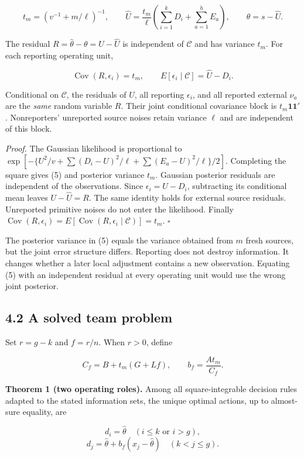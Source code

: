 \documentclass[
  11pt,
]{article}
\begin{document}
\[t_m=\left(v^{-1}+m/\ell\right)^{-1},\qquad
\widehat U=\frac{t_m}{\ell}\left(\sum_{i=1}^kD_i+\sum_{a=1}^hE_a\right),
\qquad \widehat\theta=s-\widehat U. \tag{5}\]

The residual \(R=\widehat\theta-\theta=U-\widehat U\) is independent of
\(\mathcal C\) and has variance \(t_m\). For each reporting operating
unit,

\[\operatorname{Cov}(R,\epsilon_i)=t_m,\qquad
E[\epsilon_i\mid\mathcal C]=\widehat U-D_i. \tag{6}\]

Conditional on \(\mathcal C\), the residuals of \(U\), all reporting
\(\epsilon_i\), and all reported external \(\nu_a\) are the \emph{same}
random variable \(R\). Their joint conditional covariance block is
\(t_m\mathbf1\mathbf1'\). Nonreporters' unreported source noises retain
variance \(\ell\) and are independent of this block.

\emph{Proof.} The Gaussian likelihood is proportional to
\(\exp[-\{U^2/v+\sum(D_i-U)^2/\ell+\sum(E_a-U)^2/\ell\}/2]\). Completing
the square gives (5) and posterior variance \(t_m\). Gaussian posterior
residuals are independent of the observations. Since
\(\epsilon_i=U-D_i\), subtracting its conditional mean leaves
\(U-\widehat U=R\). The same identity holds for external source
residuals. Unreported primitive noises do not enter the likelihood.
Finally
\(\operatorname{Cov}(R,\epsilon_i)=E[\operatorname{Cov}(R,\epsilon_i\mid\mathcal C)]=t_m\).
\(\square\)

The posterior variance in (5) equals the variance obtained from \(m\)
fresh sources, but the joint error structure differs. Reporting does not
destroy information. It changes whether a later local adjustment
contains a new observation. Equating (5) with an independent residual at
every operating unit would use the wrong joint posterior.

\subsection{4.2 A solved team problem}\label{a-solved-team-problem}

Set \(r=g-k\) and \(f=r/n\). When \(r>0\), define

\[C_f=B+t_m(G+Lf),\qquad b_f=\frac{At_m}{C_f}. \tag{7}\]

\textbf{Theorem 1 (two operating roles).} Among all square-integrable
decision rules adapted to the stated information sets, the unique
optimal actions, up to almost-sure equality, are

\[d_i=\widehat\theta\quad(i\leq k\text{ or }i>g),\]
\[d_j=\widehat\theta+b_f(x_j-\widehat\theta)
\quad(k<j\leq g). \tag{8}\]
\end{document}
